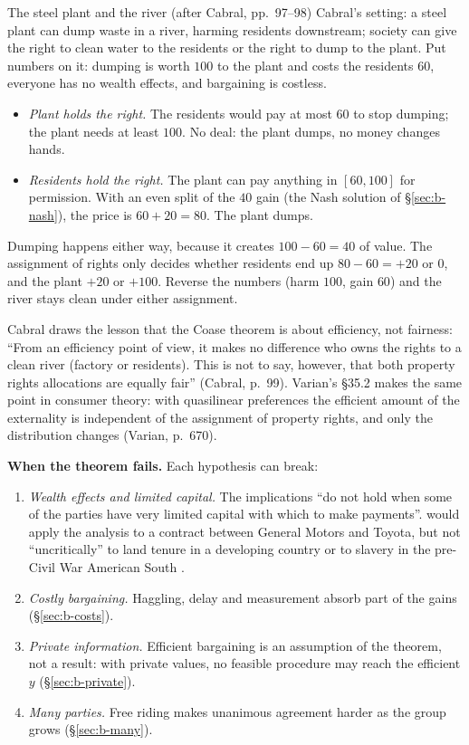 \begin{example}{The steel plant and the river (after Cabral, pp.~97--98)}
Cabral's setting: a steel plant can dump waste in a river, harming residents downstream; society
can give the right to clean water to the residents or the right to dump to the plant. Put
numbers on it: dumping is worth $100$ to the plant and costs the residents $60$, everyone has
no wealth effects, and bargaining is costless.

\begin{itemize}
  \item \emph{Plant holds the right.} The residents would pay at most $60$ to stop dumping; the
  plant needs at least $100$. No deal: the plant dumps, no money changes hands.
  \item \emph{Residents hold the right.} The plant can pay anything in $[60, 100]$ for
  permission. With an even split of the $40$ gain (the Nash solution of \S\ref{sec:b-nash}),
  the price is $60 + 20 = 80$. The plant dumps.
\end{itemize}
Dumping happens either way, because it creates $100 - 60 = 40$ of value. The assignment of rights
only decides whether residents end up $80 - 60 = +20$ or $0$, and the plant $+20$ or $+100$.
Reverse the numbers (harm $100$, gain $60$) and the river stays clean under either assignment.
\end{example}

Cabral draws the lesson that the Coase theorem is about efficiency, not fairness: ``From an
efficiency point of view, it makes no difference who owns the rights to a clean river (factory or
residents). This is not to say, however, that both property rights allocations are equally
fair'' (Cabral, p.~99). Varian's \S35.2 makes the same point in consumer theory: with
quasilinear preferences the efficient amount of the externality is independent of the
assignment of property rights, and only the distribution changes (Varian, p.~670).

\textbf{When the theorem fails.} Each hypothesis can break:
\begin{enumerate}
  \item \emph{Wealth effects and limited capital.} The implications ``do not hold when some of the
  parties have very limited capital with which to make payments''. \MR{} would apply the analysis
  to a contract between General Motors and Toyota, but not ``uncritically'' to land tenure in a
  developing country or to slavery in the pre-Civil War American South .
  \item \emph{Costly bargaining.} Haggling, delay and measurement absorb part of the gains
  (\S\ref{sec:b-costs}).
  \item \emph{Private information.} Efficient bargaining is an assumption of the theorem, not a
  result: with private values, no feasible procedure may reach the efficient $y$
  (\S\ref{sec:b-private}).
  \item \emph{Many parties.} Free riding makes unanimous agreement harder as the group grows
  (\S\ref{sec:b-many}).
\end{enumerate}

